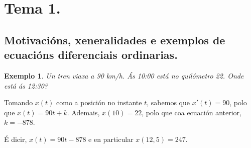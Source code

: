 \documentclass[11pt, a4paper,twoside]{article}
\makeatletter
\theoremstyle{theorem-style}  %
\renewenvironment{proof}[1][\proofname]{\par
	\pushQED{\qed}%
	\normalfont \topsep6\p@\@plus6\p@\relax
	\list{}{%
		\settowidth{\leftmargin}{\quad:\hskip\labelsep}%
		\setlength{\labelwidth}{0pt}%
		\setlength{\itemindent}{-\leftmargin}%
	}%
	\item[\hskip\labelsep\itshape#1\@addpunct{:}]\ignorespaces
}{%
	\popQED\endlist\@endpefalse
}
\theoremstyle{definition-style}
\theoremstyle{example-style}
\newtheorem{example}{Exemplo}[section]
\let\oldsection\section
\def\section{\cleardoublepage\oldsection}
\makeatother
\begin{document}
\maketitle



\newpage
\tableofcontents
\newpage

\section{Tema 1.}

\subsection{Motivacións, xeneralidades e exemplos de ecuacións diferenciais ordinarias.}
\begin{example}
	Un tren viaxa a 90 km/h. Ás 10:00 está no quilómetro 22. Onde está ás 12:30?
\end{example}
\begin{proof}[Solución]
	Tomando $x(t)$ como a posición no instante $t$, sabemos que $ x'(t)=90 $, polo que $ x(t)=90t+k $. Ademais, $ x(10)=22 $, polo que coa ecuación anterior, $ k=-878 $. 
	
	É dicir, $ x(t)=90t-878 $ e en particular $ x(12,5)= 247 $.
\end{proof}
\end{document}
